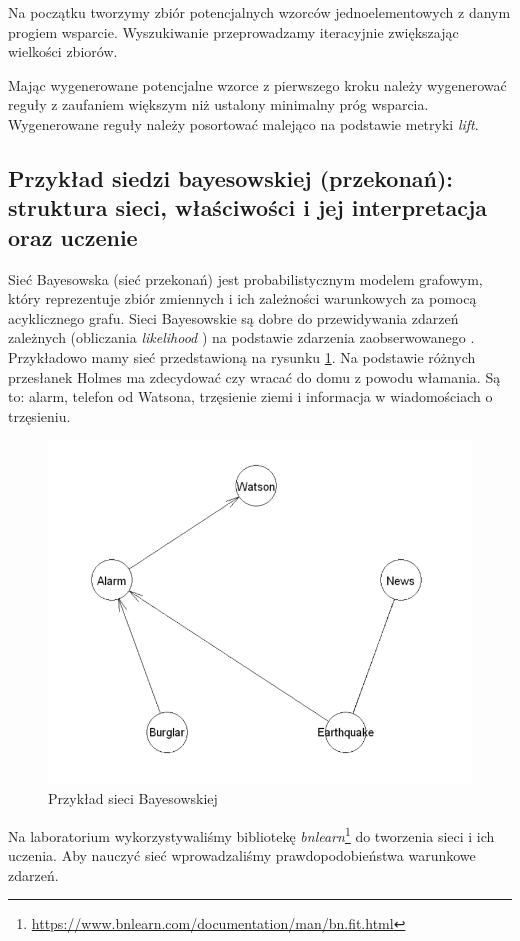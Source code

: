 \documentclass[wi]{zut}
\begin{document}
Na początku tworzymy zbiór potencjalnych wzorców jednoelementowych z danym progiem wsparcie. Wyszukiwanie przeprowadzamy iteracyjnie zwiększając wielkości zbiorów. 

Mając wygenerowane potencjalne wzorce z pierwszego kroku należy wygenerować reguły z zaufaniem większym niż ustalony minimalny próg wsparcia. Wygenerowane reguły należy posortować malejąco na podstawie metryki \emph{lift}.

\subsection{Przykład siedzi bayesowskiej (przekonań): struktura sieci, właściwości i jej interpretacja oraz uczenie}

Sieć Bayesowska (sieć przekonań) jest probabilistycznym modelem grafowym, który reprezentuje zbiór zmiennych i ich zależności warunkowych za pomocą acyklicznego grafu. Sieci Bayesowskie są dobre do przewidywania zdarzeń zależnych (obliczania \emph{likelihood} \cite{wiki:Likelihood_function}) na podstawie zdarzenia zaobserwowanego 
\cite{wiki:Bayesian_network}. Przykładowo mamy sieć przedstawioną na rysunku \ref{fig:bayesian}. Na podstawie różnych przesłanek Holmes ma zdecydować czy wracać do domu z powodu włamania. Są to: alarm, telefon od Watsona, trzęsienie ziemi i informacja w wiadomościach o trzęsieniu.


\begin{figure}[H]
    \centering
    \includegraphics[width=0.5\linewidth]{images/bayesian.png}
    \caption{Przykład sieci Bayesowskiej}
    \label{fig:bayesian}
\end{figure}


Na laboratorium wykorzystywaliśmy bibliotekę \emph{bnlearn}\footnote{\url{https://www.bnlearn.com/documentation/man/bn.fit.html}} do tworzenia sieci i ich uczenia. Aby nauczyć sieć wprowadzaliśmy prawdopodobieństwa warunkowe zdarzeń.
\question
\end{document}
